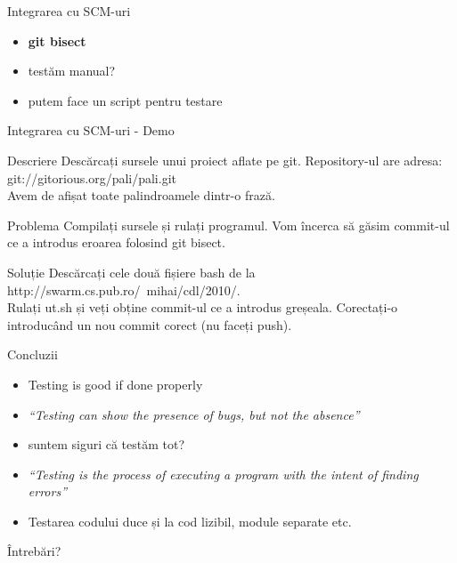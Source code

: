 \documentclass{beamer}
\begin{document}
\begin{frame}{Integrarea cu SCM-uri}
  \begin{itemize}[<+->]
    \item \textbf{git bisect}
    \item testăm manual?
    \item putem face un script pentru testare
  \end{itemize}
\end{frame}

\begin{frame}{Integrarea cu SCM-uri - Demo}
  \begin{block}{Descriere}
    Descărcați sursele unui proiect aflate pe git. Repository-ul are adresa:\\
    git://gitorious.org/pali/pali.git\\
    Avem de afișat toate palindroamele dintr-o frază.
  \end{block}
  \begin{block}{Problema}
    Compilați sursele și rulați programul. Vom încerca să găsim commit-ul ce a
    introdus eroarea folosind git bisect.
  \end{block} \pause
  \begin{block}{Soluție}
    Descărcați cele două fișiere bash de la\\
    http://swarm.cs.pub.ro/~mihai/cdl/2010/.\\
    Rulați ut.sh și veți obține commit-ul ce a introdus greșeala. Corectați-o
    introducând un nou commit corect (nu faceți push).
  \end{block}
\end{frame}

\begin{frame}{Concluzii}
  \begin{itemize}[<+->]
    \item Testing is good \pause \alert{if done properly}
    \item \textit{``Testing can show the presence of bugs, but not the absence''}
    \item suntem siguri că testăm tot?
    \item \textit{``Testing is the process of executing a program with the intent of finding errors''}
    \item Testarea codului duce și la cod lizibil, module separate etc.
  \end{itemize}
\end{frame}

\begin{frame}{Întrebări?}
\end{frame}
\end{document}
